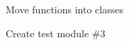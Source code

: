 
\begin{DoxyRefList}
\item[\label{todo__todo000001}%
\hypertarget{todo__todo000001}{}%
page \hyperlink{index}{S\-O\-C\-C\-E\-R T\-E\-A\-M T\-R\-A\-C\-K\-E\-R v1.0} ]Move functions into classes 

Create test module \#3
\end{DoxyRefList}